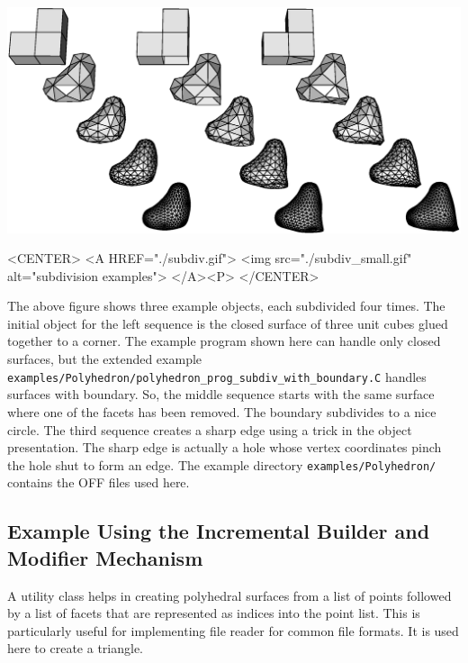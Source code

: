 \begin{ccTexOnly}
    \begin{center}
      \parbox{\textwidth}{%
          \includegraphics[width=\textwidth]{fig/subdiv.ps}%
      }
    \end{center}
\end{ccTexOnly}

\begin{ccHtmlOnly}
    <CENTER>
        <A HREF="./subdiv.gif">
            <img src="./subdiv_small.gif" alt="subdivision examples">
        </A><P>
    </CENTER>
\end{ccHtmlOnly}

The above figure shows three example objects, each 
subdivided four times. The initial object for the left sequence is
the closed surface of three unit cubes glued together to a corner.
The example program shown here can handle only closed surfaces, 
but the extended example
\texttt{examples/Polyhedron/polyhedron\_prog\_subdiv\_with\_boundary.C}
handles surfaces with boundary. So, the middle sequence starts with
the same surface where one of the facets has been removed. The boundary
subdivides to a nice circle. The third sequence creates a sharp
edge using a trick in the object presentation. The sharp edge is 
actually a hole whose vertex coordinates pinch the hole shut to form an
edge. The example directory \texttt{examples/Polyhedron/} contains the 
OFF files used here.


\subsection{Example Using the Incremental Builder and Modifier Mechanism}

A utility class  helps in
creating polyhedral surfaces from a list of points followed by a list
of facets that are represented as indices into the point list. This is
particularly useful for implementing file reader for common file
formats.  It is used here to create a triangle.

